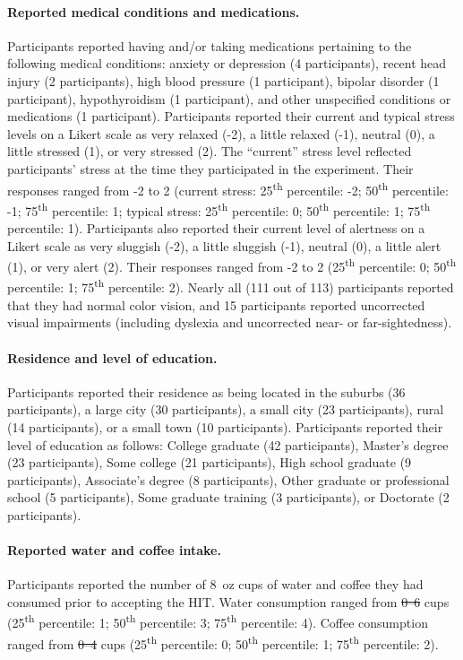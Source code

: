 \documentclass[10pt]{article}
\providecommand{\DIFaddtex}[1]{{\protect\color{blue}\uwave{#1}}} %
\providecommand{\DIFdeltex}[1]{{\protect\color{red}\sout{#1}}}                      %
\providecommand{\DIFaddbegin}{} %
\providecommand{\DIFaddend}{} %
\providecommand{\DIFdelbegin}{} %
\providecommand{\DIFdelend}{} %
\providecommand{\DIFadd}[1]{\texorpdfstring{\DIFaddtex{#1}}{#1}} %
\providecommand{\DIFdel}[1]{\texorpdfstring{\DIFdeltex{#1}}{}} %
\newcommand{\DIFscaledelfig}{0.5}
\newlength{\DIFdelgraphicswidth} %
\newlength{\DIFdelgraphicsheight} %
\newcommand{\DIFaddincludegraphics}[2][]{{\color{blue}\fbox{\DIFOincludegraphics[#1]{#2}}}} %
\newcommand{\DIFdelincludegraphics}[2][]{%
\sbox{\DIFdelgraphicsbox}{\DIFOincludegraphics[#1]{#2}}%
\settoboxwidth{\DIFdelgraphicswidth}{\DIFdelgraphicsbox} %
\settoboxtotalheight{\DIFdelgraphicsheight}{\DIFdelgraphicsbox} %
\scalebox{\DIFscaledelfig}{%
\parbox[b]{\DIFdelgraphicswidth}{\usebox{\DIFdelgraphicsbox}\\[-\baselineskip] \rule{\DIFdelgraphicswidth}{0em}}\llap{\resizebox{\DIFdelgraphicswidth}{\DIFdelgraphicsheight}{%
\setlength{\unitlength}{\DIFdelgraphicswidth}%
\begin{picture}(1,1)%
\thicklines\linethickness{2pt} %
{\color[rgb]{1,0,0}\put(0,0){\framebox(1,1){}}}%
{\color[rgb]{1,0,0}\put(0,0){\line( 1,1){1}}}%
{\color[rgb]{1,0,0}\put(0,1){\line(1,-1){1}}}%
\end{picture}%
}\hspace*{3pt}}} %
} %
\DeclareRobustCommand{\DIFaddbegin}{\DIFOaddbegin \let\includegraphics\DIFaddincludegraphics} %
\DeclareRobustCommand{\DIFaddend}{\DIFOaddend \let\includegraphics\DIFOincludegraphics} %
\DeclareRobustCommand{\DIFdelbegin}{\DIFOdelbegin \let\includegraphics\DIFdelincludegraphics} %
\DeclareRobustCommand{\DIFdelend}{\DIFOaddend \let\includegraphics\DIFOincludegraphics} %
\begin{document}
\paragraph{Reported medical conditions and medications.}
Participants reported having and/or taking medications pertaining to the following medical conditions: anxiety or
depression (4 participants), recent head injury (2 participants), high
blood pressure (1 participant), bipolar disorder (1 participant),
hypothyroidism (1 participant), and other unspecified conditions or medications (1
participant).  Participants reported their current and typical stress
levels on a Likert scale as very relaxed (-2), a little relaxed (-1),
neutral (0), a little stressed (1), or very stressed (2).  The
``current'' stress level reflected participants' stress at the time
they participated in the experiment.
Their responses
ranged from -2 to 2 (current stress: 25\textsuperscript{th} percentile: -2;
50\textsuperscript{th} percentile: -1; 75\textsuperscript{th}
percentile: 1; typical stress: 25\textsuperscript{th} percentile: 0;
50\textsuperscript{th} percentile: 1; 75\textsuperscript{th}
percentile: 1).  Participants also reported their current level of
alertness on a Likert scale as very sluggish (-2), a little sluggish
(-1), neutral (0), a little alert (1), or very alert (2).  Their
responses ranged from -2 to 2 (25\textsuperscript{th} percentile: 0;
50\textsuperscript{th} percentile: 1; 75\textsuperscript{th}
percentile: 2).  Nearly all (111 out of 113) participants reported
that they had normal color vision, and 15 participants reported
uncorrected visual impairments (including dyslexia and uncorrected
near- or far-sightedness).

\paragraph{Residence and level of education.}
Participants reported their residence
as being located in the suburbs (36 participants), a large city (30
participants), a small city (23 participants), rural (14
participants), or a small town (10 participants).  Participants
reported their level of education as follows: College graduate (42
participants), Master's degree (23 participants), Some college (21
participants), High school graduate (9 participants), Associate's
degree (8 participants), Other graduate or professional school (5
participants), Some graduate training (3 participants), or Doctorate
(2 participants).

\paragraph{Reported water and coffee intake.}
Participants reported the number of 8~oz cups of water and coffee they had
consumed prior to accepting the HIT.  Water consumption ranged from \DIFdelbegin \DIFdel{0--6 }\DIFdelend \DIFaddbegin \DIFadd{0 to 6 }\DIFaddend cups (25\textsuperscript{th} percentile: 1;
50\textsuperscript{th} percentile: 3; 75\textsuperscript{th}
percentile: 4).  Coffee consumption ranged from \DIFdelbegin \DIFdel{0--4 }\DIFdelend \DIFaddbegin \DIFadd{0 to 4 }\DIFaddend cups (25\textsuperscript{th} percentile: 0;
50\textsuperscript{th} percentile: 1; 75\textsuperscript{th}
percentile: 2).
\end{document}
